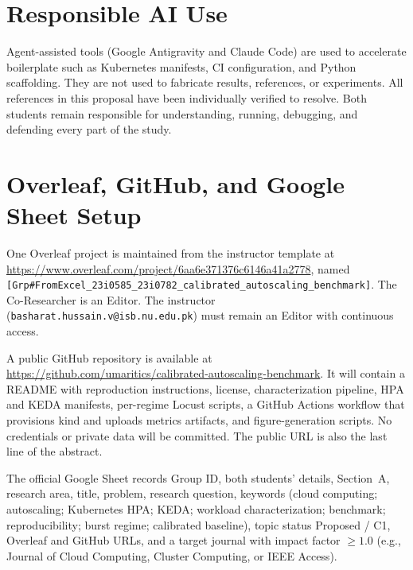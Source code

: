\documentclass[journal]{IEEEtran}
\begin{document}
\section{Responsible AI Use}
Agent-assisted tools (Google Antigravity and Claude Code) are used to accelerate boilerplate such as Kubernetes manifests, CI configuration, and Python scaffolding. They are not used to fabricate results, references, or experiments. All references in this proposal have been individually verified to resolve. Both students remain responsible for understanding, running, debugging, and defending every part of the study.

\section{Overleaf, GitHub, and Google Sheet Setup}
One Overleaf project is maintained from the instructor template at \url{https://www.overleaf.com/project/6aa6e371376c6146a41a2778}, named \texttt{[Grp\#FromExcel\_23i0585\_23i0782\_calibrated\_autoscaling\_benchmark]}. The Co-Researcher is an Editor. The instructor (\texttt{basharat.hussain.v@isb.nu.edu.pk}) must remain an Editor with continuous access.

A public GitHub repository is available at \url{https://github.com/umaritics/calibrated-autoscaling-benchmark}. It will contain a README with reproduction instructions, license, characterization pipeline, HPA and KEDA manifests, per-regime Locust scripts, a GitHub Actions workflow that provisions kind and uploads metrics artifacts, and figure-generation scripts. No credentials or private data will be committed. The public URL is also the last line of the abstract.

The official Google Sheet records Group ID, both students' details, Section~A, research area, title, problem, research question, keywords (cloud computing; autoscaling; Kubernetes HPA; KEDA; workload characterization; benchmark; reproducibility; burst regime; calibrated baseline), topic status Proposed / C1, Overleaf and GitHub URLs, and a target journal with impact factor $\geq 1.0$ (e.g., Journal of Cloud Computing, Cluster Computing, or IEEE Access).
\end{document}
